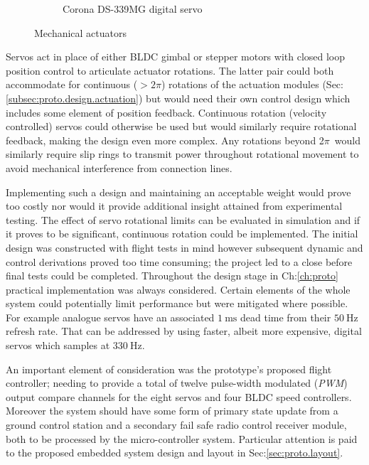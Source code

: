 \begin{figure}[hbtp]
\begin{subfigure}{0.5\textwidth}
\vspace{-6pt}
\caption{Corona DS-339MG digital servo~\cite{hobbyking}}
\label{fig:corona}
\end{subfigure}
\vspace{-8pt}
\caption{Mechanical actuators}
\vspace{-14pt}
\end{figure}
\par
Servos act in place of either BLDC gimbal or stepper motors with closed loop position control to articulate actuator rotations. The latter pair could both accommodate for continuous ($>2\pi$) rotations of the actuation modules (Sec:\ref{subsec:proto.design.actuation}) but would need their own control design which includes some element of position feedback. Continuous rotation (velocity controlled) servos could otherwise be used but would similarly require rotational feedback, making the design even more complex. Any rotations beyond 2$\pi$~would similarly require slip rings to transmit power throughout rotational movement to avoid mechanical interference from connection lines. 
\par
Implementing such a design and maintaining an acceptable weight would prove too costly nor would it provide additional insight attained from experimental testing. The effect of servo rotational limits can be evaluated in simulation and if it proves to be significant, continuous rotation could be implemented. The initial design was constructed with flight tests in mind however subsequent dynamic and control derivations proved too time consuming; the project led to a close before final tests could be completed. Throughout the design stage in Ch:\ref{ch:proto} practical implementation was always considered. Certain elements of the whole system could potentially limit performance but were mitigated where possible. For example analogue servos have an associated $1~\text{ms}$ dead time from their $50~\text{Hz}$ refresh rate. That can be addressed by using faster, albeit more expensive, digital servos which samples at $330~\text{Hz}$. 
\par
An important element of consideration was the prototype's proposed flight controller; needing to provide a total of twelve pulse-width modulated (\emph{PWM}) output compare channels for the eight servos and four BLDC speed controllers.  Moreover the system should have some form of primary state update from a ground control station and a secondary fail safe radio control receiver module, both to be processed by the micro-controller system. Particular attention is paid to the proposed embedded system design and layout in Sec:\ref{sec:proto.layout}.
